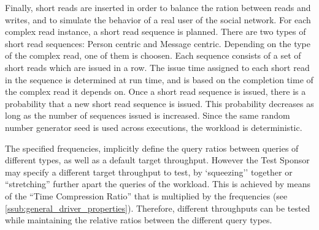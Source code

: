 Finally, short reads are inserted in order to balance the ration between reads
and writes, and to simulate the behavior of a real user of the social network.
For each complex read instance, a short read sequence is planned. There are two
types of short read sequences: Person centric and Message centric. Depending on
the type of the complex read, one of them is choosen. Each sequence consists of
a set of short reads which are issued in a row. The issue time assigned to each
short read in the sequence is determined at run time, and is based on the
completion time of the complex read it depends on. Once a short read sequence
is issued, there is a probability that a new short read sequence is issued.
This probability decreases as long as the number of sequences issued is
increased. Since the same random number generator seed is used across
executions, the workload is deterministic.


The specified frequencies, implicitly define the query ratios between queries
of different types, as well as a default target throughput. However the Test
Sponsor may specify a different target throughput to test,  by `squeezing''
together or ``stretching'' further apart the queries of the workload. This is
achieved  by means of the ``Time Compression Ratio'' that is multiplied by the
frequencies (see \ref{ssub:general_driver_properties}).  Therefore, different
throughputs can be tested while maintaining the relative ratios between the
different query types.

